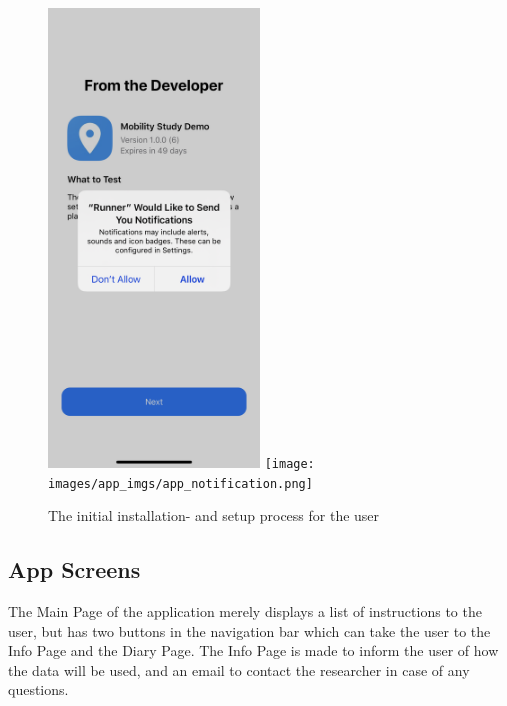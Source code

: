 \begin{figure}
    \includegraphics[width=0.5\textwidth]{images/app_imgs/app_permission.png}
    \texttt{[image: images/app\_imgs/app\_notification.png]}
    \caption{The initial installation- and setup process for the user}
    \label{fig:my_label}
\end{figure}

\subsection{App Screens}
The Main Page of the application merely displays a list of instructions to the user, but has two buttons in the navigation bar which can take the user to the Info Page and the Diary Page. The Info Page is made to inform the user of how the data will be used, and an email to contact the researcher in case of any questions.

